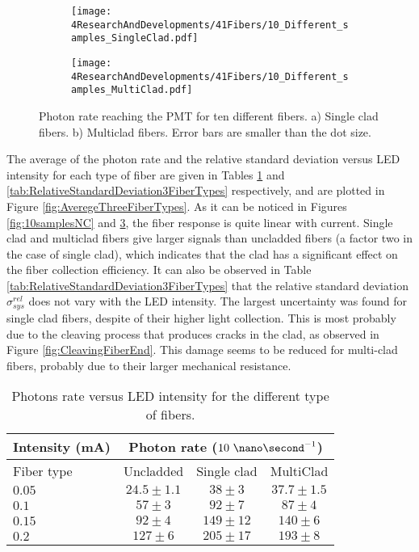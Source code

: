 \begin{figure}
\centering
    \begin{subfigure}[b]{1\textwidth}
    \centering
    \texttt{[image: 4ResearchAndDevelopments/41Fibers/10\_Different\_samples\_SingleClad.pdf]}  
    \caption{\label{subfig:10samplesSC}}
    \end{subfigure}
    \hfill
    \begin{subfigure}[b]{1\textwidth}
    \centering
    \texttt{[image: 4ResearchAndDevelopments/41Fibers/10\_Different\_samples\_MultiClad.pdf]}  
    \caption{\label{subfig:10samplesMC}}
    \end{subfigure}
 \caption{Photon rate reaching the PMT for ten different fibers. a) Single clad fibers. b) Multiclad fibers. Error bars are smaller than the dot size.}
 \label{fig:10samplesThreeTypes}
\end{figure}
The average of the photon rate and the relative standard deviation versus LED intensity for each type of fiber are given in Tables \ref{tab:10DifferentSamples} and \ref{tab:RelativeStandardDeviation3FiberTypes} respectively, and are plotted in Figure \ref{fig:AveregeThreeFiberTypes}. As it can be noticed in Figures \ref{fig:10samplesNC} and \ref{fig:10samplesThreeTypes}, the fiber response is quite linear with current. Single clad and multiclad fibers give larger signals than uncladded fibers (a factor two in the case of single clad), which indicates that the clad has a significant effect on the fiber collection efficiency. It can also be observed in Table \ref{tab:RelativeStandardDeviation3FiberTypes} that the relative standard deviation $\sigma^{rel}_{sys}$ does not vary with the LED intensity. The largest uncertainty was found for single clad fibers, despite of their higher light collection. This is most probably due to the cleaving process that produces cracks in the clad, as observed in Figure \ref{fig:CleavingFiberEnd}. This damage seems to be reduced for multi-clad fibers, probably due to their larger mechanical resistance.

\begin{table}[h]
\centering{}%
\begin{tabular}{lccc}
\toprule 
Intensity (mA) & \multicolumn{3}{c}{Photon rate ($10~\nano\second^{-1}$)} \tabularnewline
\midrule
Fiber type & Uncladded & Single clad & MultiClad \tabularnewline
\midrule
\midrule 
$0.05$ & $24.5 \pm 1.1$ & $38 \pm 3$ & $37.7 \pm 1.5$ \tabularnewline
$0.1$ & $57 \pm 3$ & $92 \pm 7$ & $87 \pm 4$ \tabularnewline
$0.15$ & $92 \pm 4$ & $149 \pm 12$ & $140 \pm 6$ \tabularnewline
$0.2$ & $127 \pm 6$ & $205 \pm 17$ & $193 \pm 8$ \tabularnewline
\bottomrule
\end{tabular}
\caption{Photons rate versus LED intensity for the different type of fibers.}
\label{tab:10DifferentSamples}
\end{table}

